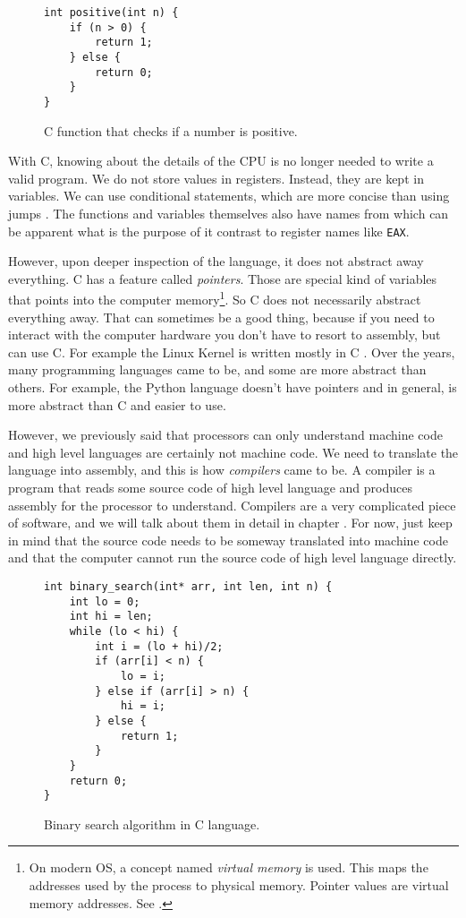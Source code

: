 \begin{figure}\label{fig:c-positive}
\begin{verbatim}
int positive(int n) {
    if (n > 0) {
        return 1;
    } else {
        return 0;
    }
}
\end{verbatim}
\caption{C function that checks if a number is positive.}
\end{figure}

With C, knowing about the details of the CPU is no longer needed to write a
valid program. We do not store values in registers. Instead, they are kept in
variables. We can use conditional statements, which are more concise than using
jumps \cite{gotobad}. The functions and variables themselves also have names
from which can be apparent what is the purpose of it contrast to register names
like \texttt{EAX}.

However, upon deeper inspection of the language, it does not abstract away
everything. C has a feature called \textit{pointers}. Those are special kind of
variables that points into the computer memory\footnote{On modern OS, a concept
named \textit{virtual memory} is used. This maps the addresses used by the
process to physical memory. Pointer values are virtual memory addresses. See
\cite{modern-os}.}. So C does not necessarily abstract everything away. That
can sometimes be a good thing, because if you need to interact with the
computer hardware you don't have to resort to assembly, but can use C. For
example the Linux Kernel is written mostly in C \cite{linux-source}. Over the
years, many programming languages came to be, and some are more abstract than
others. For example, the Python language doesn't have pointers and in general,
is more abstract than C and easier to use.

However, we previously said that processors can only understand machine code
and high level languages are certainly not machine code. We need to translate
the language into assembly, and this is how \textit{compilers} came to be. A
compiler is a program that reads some source code of high level language and
produces assembly for the processor to understand. Compilers are a very
complicated piece of software, and we will talk about them in detail in chapter
. For now, just keep in mind that the source
code needs to be someway translated into machine code and that the computer
cannot run the source code of high level language directly.

\begin{figure}[H]\label{fig:binary-search}
    \begin{verbatim}
int binary_search(int* arr, int len, int n) {
    int lo = 0;
    int hi = len;
    while (lo < hi) {
        int i = (lo + hi)/2;
        if (arr[i] < n) {
            lo = i;
        } else if (arr[i] > n) {
            hi = i;
        } else {
            return 1;
        }
    }
    return 0;
}
    \end{verbatim}
    \caption{Binary search algorithm in C language.}
\end{figure}

